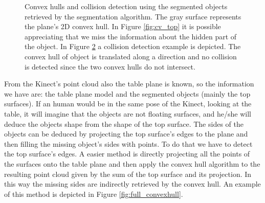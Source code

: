 \begin{figure}[tb]
\begin{subfigure}[t]{0.3\textwidth}
\caption{}\label{fig:cv_top_collision}
\end{subfigure}
\caption{Convex hulls and collision detection using the segmented objects retrieved by the  segmentation algorithm. The gray surface represents the plane's 2D convex hull. In Figure \ref{fig:cv_top} it is possible appreciating that we miss the information about the hidden part of the object. In Figure \ref{fig:cv_top_collision} a collision detection example is depicted. The convex hull of object  is translated along a direction and no collision is detected  since the two convex hulls do not intersect.}
\end{figure}

From the Kinect's point cloud also the table plane is known, so the information we have are: the table plane model and the segmented objects (mainly the top surfaces).
If an human would be in the same pose of the Kinect, looking at the table, it will imagine that the objects are not floating surfaces, and he/she will deduce the objects shape from the shape of the top surface. The sides of the objects can be deduced by projecting the top surface's edges to the plane and then filling the missing object's sides with points. To do that we have to detect the top surface's edges. A easier method is directly projecting all the points of the surfaces onto the table plane and then apply the convex hull algorithm to the resulting point cloud given by the sum of the top surface and its projection. In this way the missing sides are indirectly retrieved by the convex hull. An example of this method is depicted in Figure \ref{fig:full_convexhull}.

